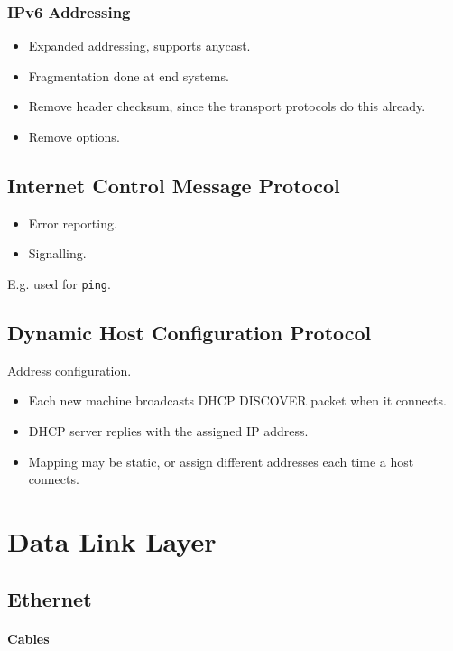 \documentclass[twocolumn,english]{article}
\begin{document}
\subsubsection{IPv6 Addressing}
\begin{itemize}
\item Expanded addressing, supports anycast.
\item Fragmentation done at end systems.
\item Remove header checksum, since the transport protocols do this already.
\item Remove options.
\end{itemize}

\subsection{Internet Control Message Protocol}
\begin{itemize}
\item Error reporting.
\item Signalling.
\end{itemize}
E.g. used for \texttt{ping}.

\subsection{Dynamic Host Configuration Protocol}

Address configuration.
\begin{itemize}
\item Each new machine broadcasts DHCP DISCOVER packet when it connects.
\item DHCP server replies with the assigned IP address.
\item Mapping may be static, or assign different addresses each time a host
connects.
\end{itemize}

\section{Data Link Layer}

\subsection{Ethernet}

\paragraph{Cables}
\end{document}
